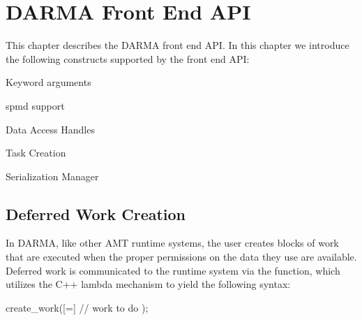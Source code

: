 
\chapter{DARMA Front End API}
\label{chap:front_end}
This chapter describes the DARMA \gls{front end} \gls{API}. In this chapter we
introduce the following constructs supported by the \gls{front end} \gls{API}:
\begin{compactitem}
\item Keyword arguments
\item \gls{spmd} support
\item Data Access Handles
\item Task Creation
\item Serialization Manager
\end{compactitem}


\section{Deferred Work Creation}
\label{sec:deferred}
In DARMA, like other AMT runtime systems, the user creates blocks of work that
are executed when the proper permissions on the data they use are available. 
Deferred work is communicated to the runtime system via the
 function, which utilizes the C++ lambda mechanism to
yield the following syntax:
\begin{CppCode}
  create_work([=]{
    // work to do
  });
\end{CppCode}

